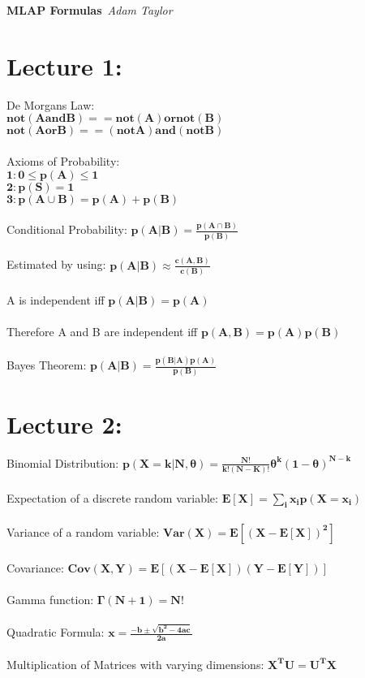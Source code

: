 \documentclass{article}
\begin{document}
\begin{center}
\Large\textbf{MLAP Formulas}\
\large\textit{Adam Taylor}
\newline
\end{center}
\section{Lecture 1:}
De Morgans Law:\\ $\mathbf{not(A and B) == not(A) or not(B)}$\\
$\mathbf{not(A or B) == (not A) and (not B)}$\\\\
Axioms of Probability:\\ $\mathbf{1: 0 \leq p(A) \leq 1}$\\
$\mathbf{2: p(S) = 1}$\\
$\mathbf{3: p(A \cup B ) = p(A) + p(B)}$\\\\
Conditional Probability: $\mathbf {p(A|B) = \frac{p(A\cap B)}{p(B)}}$\\\\
Estimated by using: $\mathbf{p(A|B) \approx \frac{c(A,B)}{c(B)}}$\\\\
A is independent iff $\mathbf{p(A|B) = p(A)}$\\\\
Therefore A and B are independent iff $\mathbf{p(A,B) = p(A)p(B)}$\\\\
Bayes Theorem: $\mathbf{p(A|B) = \frac{p(B|A)p(A)}{p(B)}}$
\section{Lecture 2:}
Binomial Distribution: $\mathbf{p(X = k|N, \theta) = \frac{N!}{k!(N-K)!}\theta^k(1-\theta)^{N-k}}$\\\\
Expectation of a discrete random variable: $\mathbf{E[X] = \sum\limits_{i}^{} x_ip(X=x_i)}$\\\\
Variance of a random variable: $\mathbf{Var(X) = E[(X-E[X])^2]}$\\\\
Covariance: $\mathbf{Cov(X,Y) = E[(X-E[X])(Y-E[Y])]}$\\\\
Gamma function: $\mathbf{\Gamma (N+1) = N!}$\\\\
Quadratic Formula: $\mathbf{x = \frac{-b\pm\sqrt{b^2 - 4ac}}{2a}}$\\\\
Multiplication of Matrices with varying dimensions: $\mathbf{X^TU=U^TX}$ 
\end{document}
